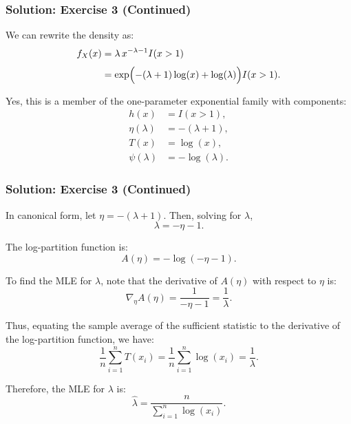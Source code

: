 \documentclass{beamer}
\begin{document}
\begin{frame}
\frametitle{Solution: Exercise 3 (Continued)}

We can rewrite the density as:
\[
\begin{aligned}
f_X(x) &= \lambda \, x^{-\lambda - 1} I(x > 1)\\[1mm]
&= \exp\Bigl( -(\lambda+1)\log(x) + \log(\lambda) \Bigr) I(x > 1).
\end{aligned}
\]

Yes, this is a member of the one-parameter exponential family with components:
\[
\begin{aligned}
h(x) &= I(x > 1),\\[1mm]
\eta(\lambda) &= -(\lambda + 1),\\[1mm]
T(x) &= \log(x),\\[1mm]
\psi(\lambda) &= -\log(\lambda).
\end{aligned}
\]

\end{frame}

%
%
%
%
%
%
%
%
%

\begin{frame}
\frametitle{Solution: Exercise 3 (Continued)}

In canonical form, let \(\eta = -(\lambda+1)\). Then, solving for \(\lambda\),
\[
\lambda = -\eta - 1.
\]

The log-partition function is:
\[
A(\eta) = -\log(-\eta - 1).
\]

To find the MLE for \(\lambda\), note that the derivative of \(A(\eta)\) with respect to \(\eta\) is:
\[
\nabla_\eta A(\eta) = \frac{1}{-\eta - 1} = \frac{1}{\lambda}.
\]

Thus, equating the sample average of the sufficient statistic to the derivative of the log-partition function, we have:
\[
\frac{1}{n}\sum_{i = 1}^n T(x_i) = \frac{1}{n}\sum_{i = 1}^n \log(x_i) = \frac{1}{\lambda}.
\]

Therefore, the MLE for \(\lambda\) is:
\[
\widehat{\lambda} = \frac{n}{\sum_{i=1}^n \log(x_i)}.
\]
\end{frame}
\end{document}
